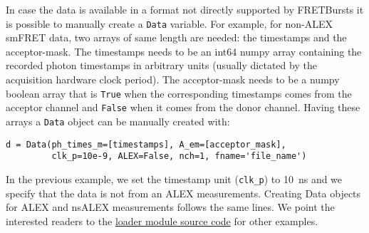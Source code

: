 In case the data is available in a format not directly supported by FRETBursts it is possible to manually create a \verb|Data| variable. For example, for non-ALEX smFRET data, two arrays of same length are needed: the timestamps and the acceptor-mask. The timestamps needs to be an int64 numpy array containing the recorded photon timestamps in arbitrary units (usually dictated by the acquisition hardware clock period). The acceptor-mask needs to be a numpy boolean array that is \verb|True| when the corresponding timestamps comes from the acceptor channel and \verb|False| when it comes from the donor channel. Having these arrays a \verb|Data| object can be manually created with:

\begin{verbatim}
d = Data(ph_times_m=[timestamps], A_em=[acceptor_mask], 
         clk_p=10e-9, ALEX=False, nch=1, fname='file_name')
\end{verbatim}

In the previous example, we set the timestamp unit (\verb|clk_p|) to 10~ns and we specify that the data is not from an ALEX measurements. Creating Data objects for ALEX and nsALEX measurements follows the same lines. We point the interested readers to the \href{https://github.com/tritemio/FRETBursts/blob/master/fretbursts/loader.py}{loader module source code} for other examples. 
